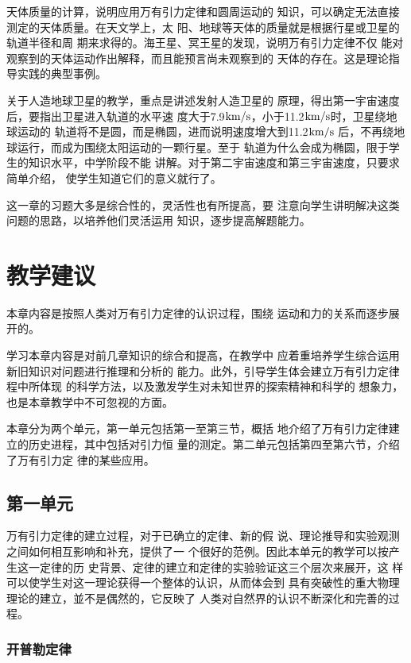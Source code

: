 天体质量的计算，说明应用万有引力定律和圆周运动的
知识，可以确定无法直接测定的天体质量。在天文学上，太
阳、地球等天体的质量就是根据行星或卫星的轨道半径和周
期来求得的。海王星、冥王星的发现，说明万有引力定律不仅
能对观察到的天体运动作出解释，而且能预言尚未观察到的
天体的存在。这是理论指导实践的典型事例。

关于人造地球卫星的教学，重点是讲述发射人造卫星的
原理，得出第一宇宙速度后，要指出卫星进入轨道的水平速
度大于7.9${\rm km/s}$，小于11.2${\rm km/s}$时，卫星绕地球运动的
轨道将不是圆，而是椭圆，进而说明速度增大到11.2${\rm km/s}$
后，不再绕地球运行，而成为围绕太阳运动的一颗行星。至于
轨道为什么会成为椭圆，限于学生的知识水平，中学阶段不能
讲解。对于第二宇宙速度和第三宇宙速度，只要求简单介绍，
使学生知道它们的意义就行了。

这一章的习题大多是综合性的，灵活性也有所提高，要
注意向学生讲明解决这类问题的思路，以培养他们灵活运用
知识，逐步提高解题能力。

\section{教学建议}
本章内容是按照人类对万有引力定律的认识过程，围绕
运动和力的关系而逐步展开的。

学习本章内容是对前几章知识的综合和提高，在教学中
应着重培养学生综合运用新旧知识对问题进行推理和分析的
能力。此外，引导学生体会建立万有引力定律程中所体现
的科学方法，以及激发学生对未知世界的探索精神和科学的
想象力，也是本章教学中不可忽视的方面。

本章分为两个单元，第一单元包括第一至第三节，概括
地介绍了万有引力定律建立的历史进程，其中包括对引力恒
量的测定。第二单元包括第四至第六节，介绍了万有引力定
律的某些应用。

\subsection{第一单元}

万有引力定律的建立过程，对于已确立的定律、新的假
说、理论推导和实验观测之间如何相互影响和补充，提供了一
个很好的范例。因此本单元的教学可以按产生这一定律的历
史背景、定律的建立和定律的实验验证这三个层次来展开，这
样可以使学生对这一理论获得一个整体的认识，从而体会到
具有突破性的重大物理理论的建立，並不是偶然的，它反映了
人类对自然界的认识不断深化和完善的过程。

\subsubsection{开普勒定律}

